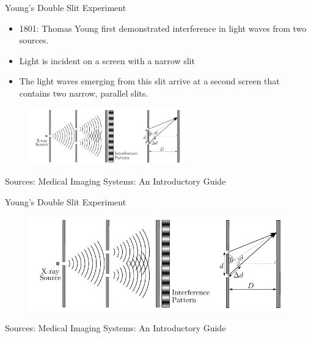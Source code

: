 \begin{frame}[c]{Young's Double Slit Experiment}
    \begin{itemize}
        \setlength\itemsep{0.2cm}
        \item 1801: Thomas Young first demonstrated interference in light waves from two sources.
        \item Light is incident on a screen with a narrow slit
        \item The light waves emerging from this slit arrive at a second screen that contains two narrow, parallel slits.
    \end{itemize}

    \begin{figure}
        \centering{}
        \includegraphics[width=0.6\textwidth, trim={0  0 3.5cm 0},clip]{images/slit_book.pdf}
    \end{figure}
    \vspace{-0.4cm}
    \begin{flushright}
        \tiny Sources: Medical Imaging Systems: An Introductory Guide~\cite{bopp18}
    \end{flushright}
\end{frame}

\begin{frame}[c]{Young's Double Slit Experiment}
    \begin{figure}
        \centering{}
        \includegraphics[width=\textwidth]{images/slit_book.pdf}
    \end{figure}
    \begin{flushright}
        \tiny Sources: Medical Imaging Systems: An Introductory Guide~\cite{bopp18}
    \end{flushright}
\end{frame}

